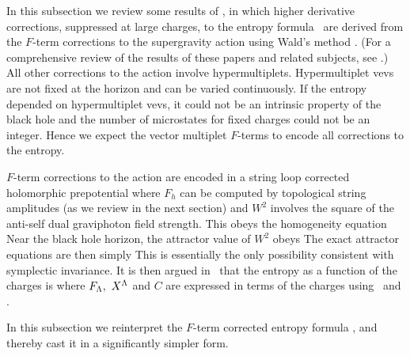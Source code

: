  In this subsection we review
some results of , in which higher
derivative corrections, suppressed at large charges, to the
entropy formula \ent\ are derived from the $F$-term
corrections to the supergravity action using Wald's method \wald.
(For a comprehensive review of the results of these papers and
related subjects, see \mohaupt.) All other corrections to the
action involve hypermultiplets. Hypermultiplet vevs are not fixed
at the horizon and can be varied continuously. If the entropy
depended on hypermultiplet vevs, it could not be an intrinsic
property of the black hole and the number of microstates for fixed
charges could not be an integer. Hence we expect the vector
multiplet $F$-terms to encode all corrections to the entropy.

$F$-term corrections to the action are encoded in a string loop
corrected holomorphic prepotential \eqn{} where $F_h$ can be computed by
topological string amplitudes (as we review in the next section)
and $W^2$ involves the square of the anti-self dual graviphoton
field strength. This obeys the homogeneity equation
\eqn{}
Near the black hole horizon, the attractor value of $W^2$ obeys
\eqn{} The exact attractor equations are then
simply \eqn{}
\eqn{} This is essentially the only possibility consistent with
symplectic invariance. It is then argued in \ that the entropy as a function of the charges is
\eqn{} where $F_{\Lambda},~X^{\Lambda}$
and $C$ are expressed in terms of the charges using \psrf\ and
\qrsf.





In this subsection we reinterpret the $F$-term corrected entropy
formula \fdc, and thereby cast it in a significantly simpler form.

